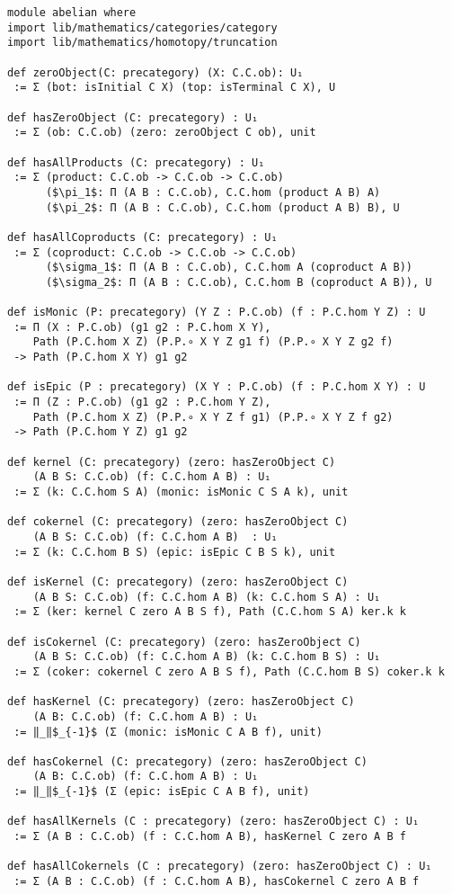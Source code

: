 \begin{lstlisting}
module abelian where
import lib/mathematics/categories/category
import lib/mathematics/homotopy/truncation

def zeroObject(C: precategory) (X: C.C.ob): U₁
 := Σ (bot: isInitial C X) (top: isTerminal C X), U

def hasZeroObject (C: precategory) : U₁
 := Σ (ob: C.C.ob) (zero: zeroObject C ob), unit

def hasAllProducts (C: precategory) : U₁
 := Σ (product: C.C.ob -> C.C.ob -> C.C.ob)
      ($\pi_1$: Π (A B : C.C.ob), C.C.hom (product A B) A)
      ($\pi_2$: Π (A B : C.C.ob), C.C.hom (product A B) B), U

def hasAllCoproducts (C: precategory) : U₁
 := Σ (coproduct: C.C.ob -> C.C.ob -> C.C.ob)
      ($\sigma_1$: Π (A B : C.C.ob), C.C.hom A (coproduct A B))
      ($\sigma_2$: Π (A B : C.C.ob), C.C.hom B (coproduct A B)), U

def isMonic (P: precategory) (Y Z : P.C.ob) (f : P.C.hom Y Z) : U
 := Π (X : P.C.ob) (g1 g2 : P.C.hom X Y),
    Path (P.C.hom X Z) (P.P.∘ X Y Z g1 f) (P.P.∘ X Y Z g2 f)
 -> Path (P.C.hom X Y) g1 g2

def isEpic (P : precategory) (X Y : P.C.ob) (f : P.C.hom X Y) : U
 := Π (Z : P.C.ob) (g1 g2 : P.C.hom Y Z),
    Path (P.C.hom X Z) (P.P.∘ X Y Z f g1) (P.P.∘ X Y Z f g2)
 -> Path (P.C.hom Y Z) g1 g2

def kernel (C: precategory) (zero: hasZeroObject C)
    (A B S: C.C.ob) (f: C.C.hom A B) : U₁
 := Σ (k: C.C.hom S A) (monic: isMonic C S A k), unit

def cokernel (C: precategory) (zero: hasZeroObject C)
    (A B S: C.C.ob) (f: C.C.hom A B)  : U₁
 := Σ (k: C.C.hom B S) (epic: isEpic C B S k), unit

def isKernel (C: precategory) (zero: hasZeroObject C)
    (A B S: C.C.ob) (f: C.C.hom A B) (k: C.C.hom S A) : U₁
 := Σ (ker: kernel C zero A B S f), Path (C.C.hom S A) ker.k k

def isCokernel (C: precategory) (zero: hasZeroObject C)
    (A B S: C.C.ob) (f: C.C.hom A B) (k: C.C.hom B S) : U₁
 := Σ (coker: cokernel C zero A B S f), Path (C.C.hom B S) coker.k k

def hasKernel (C: precategory) (zero: hasZeroObject C)
    (A B: C.C.ob) (f: C.C.hom A B) : U₁
 := ‖_‖$_{-1}$ (Σ (monic: isMonic C A B f), unit)

def hasCokernel (C: precategory) (zero: hasZeroObject C)
    (A B: C.C.ob) (f: C.C.hom A B) : U₁
 := ‖_‖$_{-1}$ (Σ (epic: isEpic C A B f), unit)

def hasAllKernels (C : precategory) (zero: hasZeroObject C) : U₁
 := Σ (A B : C.C.ob) (f : C.C.hom A B), hasKernel C zero A B f

def hasAllCokernels (C : precategory) (zero: hasZeroObject C) : U₁
 := Σ (A B : C.C.ob) (f : C.C.hom A B), hasCokernel C zero A B f
\end{lstlisting}    
    
